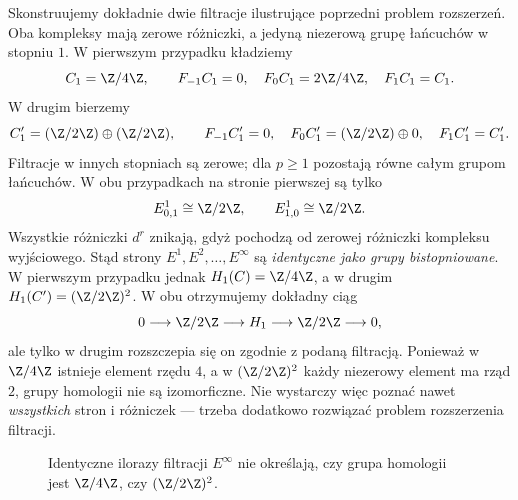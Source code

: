 \begin{przyklad}
\label{prz:spectral-extension-z4}
Skonstruujemy dokładnie dwie filtracje ilustrujące
poprzedni problem rozszerzeń. Oba kompleksy mają
zerowe różniczki, a jedyną niezerową grupę
łańcuchów w stopniu $1$.
W pierwszym przypadku kładziemy
\[
 C_1=\Z/4\Z,\qquad
 F_{-1}C_1=0,\quad
 F_0C_1=2\Z/4\Z,\quad
 F_1C_1=C_1.
\]
W drugim bierzemy
\[
 C'_1=(\Z/2\Z)\oplus(\Z/2\Z),\qquad
 F_{-1}C'_1=0,\quad
 F_0C'_1=(\Z/2\Z)\oplus0,\quad
 F_1C'_1=C'_1.
\]
Filtracje w innych stopniach są zerowe; dla
$p\ge1$ pozostają równe całym grupom łańcuchów.
W obu przypadkach na stronie pierwszej są tylko
\[
 E^1_{0,1}\cong\Z/2\Z,\qquad
 E^1_{1,0}\cong\Z/2\Z.
\]
Wszystkie różniczki $d^r$ znikają, gdyż pochodzą
od zerowej różniczki kompleksu wyjściowego.
Stąd strony $E^1,E^2,\ldots,E^\infty$
są \emph{identyczne jako grupy bistopniowane}.
W pierwszym przypadku jednak
$H_1(C)=\Z/4\Z$, a w drugim
$H_1(C')=(\Z/2\Z)^2$.
W obu otrzymujemy dokładny ciąg
\[
 0\longrightarrow\Z/2\Z
 \longrightarrow H_1
 \longrightarrow\Z/2\Z
 \longrightarrow0,
\]
ale tylko w drugim rozszczepia się on zgodnie
z podaną filtracją. Ponieważ w $\Z/4\Z$
istnieje element rzędu $4$, a w $(\Z/2\Z)^2$
każdy niezerowy element ma rząd $2$,
grupy homologii nie są izomorficzne.
Nie wystarczy więc poznać nawet \emph{wszystkich}
stron i różniczek — trzeba dodatkowo rozwiązać
problem rozszerzenia filtracji.
\end{przyklad}

\begin{figure}[!htbp]
\centering
{}
\caption{Identyczne ilorazy filtracji $E^\infty$
nie określają, czy grupa homologii jest
$\Z/4\Z$, czy $(\Z/2\Z)^2$.}
\label{fig:spectral-extension-z4}
\end{figure}


